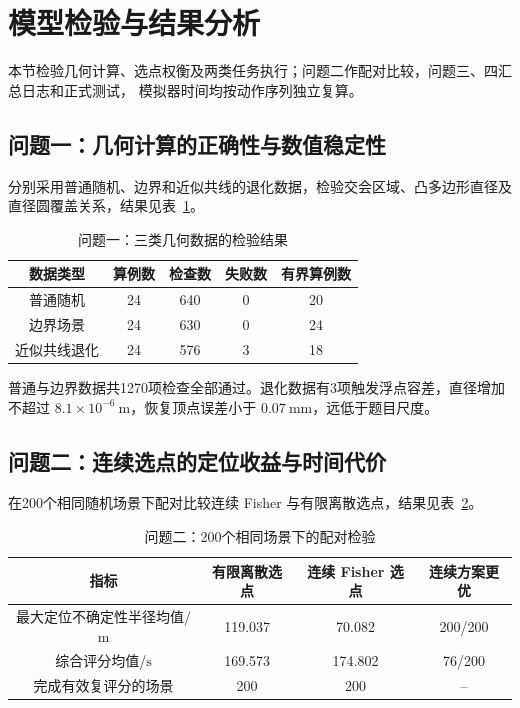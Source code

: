 \section{模型检验与结果分析}

本节检验几何计算、选点权衡及两类任务执行；问题二作配对比较，问题三、四汇总日志和正式测试，
模拟器时间均按动作序列独立复算。

\subsection{问题一：几何计算的正确性与数值稳定性}

分别采用普通随机、边界和近似共线的退化数据，检验交会区域、凸多边形直径及直径圆覆盖关系，结果见表~\ref{tab:q1-validation-short}。

\begin{table}[H]
  \centering
  \caption{问题一：三类几何数据的检验结果}
  \label{tab:q1-validation-short}
  \small
  \renewcommand{\arraystretch}{1.15}
  \begin{tabular}{@{}ccccc@{}}
    \toprule
    数据类型 & 算例数 & 检查数 & 失败数 & 有界算例数 \\
    \midrule
    普通随机 & 24 & 640 & 0 & 20 \\
    边界场景 & 24 & 630 & 0 & 24 \\
    近似共线退化 & 24 & 576 & 3 & 18 \\
    \bottomrule
  \end{tabular}
\end{table}

普通与边界数据共1270项检查全部通过。退化数据有3项触发浮点容差，直径增加不超过
$8.1\times10^{-6}\ \mathrm m$，恢复顶点误差小于 $0.07\ \mathrm{mm}$，远低于题目尺度。

\subsection{问题二：连续选点的定位收益与时间代价}

在200个相同随机场景下配对比较连续 Fisher 与有限离散选点，结果见表~\ref{tab:q2-validation-short}。

\begin{table}[H]
  \centering
  \caption{问题二：200个相同场景下的配对检验}
  \label{tab:q2-validation-short}
  \small
  \renewcommand{\arraystretch}{1.15}
  \begin{tabular}{@{}cccc@{}}
    \toprule
    指标 & 有限离散选点 & 连续 Fisher 选点 & 连续方案更优 \\
    \midrule
    最大定位不确定性半径均值/$\mathrm m$ & 119.037 & 70.082 & 200/200 \\
    综合评分均值/$\mathrm s$ & 169.573 & 174.802 & 76/200 \\
    完成有效复评分的场景 & 200 & 200 & -- \\
    \bottomrule
  \end{tabular}
\end{table}

